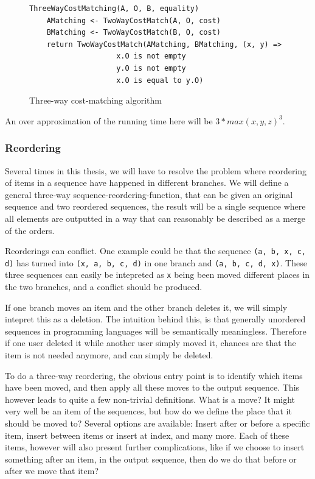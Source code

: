 \documentclass[11pt]{article}
\begin{document}
\begin{figure}
\begin{verbatim}
ThreeWayCostMatching(A, O, B, equality)
    AMatching <- TwoWayCostMatch(A, O, cost)
    BMatching <- TwoWayCostMatch(B, O, cost)
    return TwoWayCostMatch(AMatching, BMatching, (x, y) =>
                    x.O is not empty
                    y.O is not empty
                    x.O is equal to y.O)
\end{verbatim}
\caption{Three-way cost-matching algorithm}
  \label{ThreeWayCostMatchingAlgorithm}
\end{figure}

An over approximation of the running time here will be  $3*max(x, y, z)^3$.


\subsubsection{Reordering}
\label{ThreeWayReorderingAlgorithmSec}
Several times in this thesis, we will have to resolve the problem where reordering of items in a sequence have happened in different branches. We will define a general three-way sequence-reordering-function, that can be given an original sequence and two reordered sequences, the result will be a single sequence where all elements are outputted in a way that can reasonably be described as a merge of the orders.

Reorderings can conflict. One example could be that the sequence \texttt{(a, b, x, c, d)} has turned into \texttt{(x, a, b, c, d)} in one branch and \texttt{(a, b, c, d, x)}. These three sequences can easily be intepreted as \texttt{x} being been moved different places in the two branches, and a conflict should be produced.

If one branch moves an item and the other branch deletes it, we will simply intepret this as a deletion. The intuition behind this, is that generally unordered sequences in programming languages will be semantically meaningless. Therefore if one user deleted it while another user simply moved it, chances are that the item is not needed anymore, and can simply be deleted.

To do a three-way reordering, the obvious entry point is to identify which items have been moved, and then apply all these moves to the output sequence. This however leads to quite a few non-trivial definitions. What is a move? It might very well be an item of the sequences, but how do we define the place that it should be moved to? Several options are available: Insert after or before a specific item, insert between items or insert at index, and many more. Each of these items, however will also present further complications, like if we choose to insert something after an item, in the output sequence, then do we do that before or after we move that item?
\end{document}
